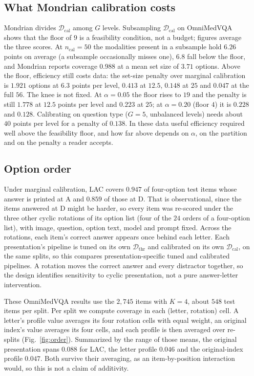 \documentclass[a4paper,conference]{IEEEtran}
\newcommand{\Dthr}{\mathcal{D}_{\mathrm{thr}}}
\newcommand{\Dcal}{\mathcal{D}_{\mathrm{cal}}}
\newcommand{\rtag}[1]{}
\begin{document}
\subsection{What Mondrian calibration costs}\label{sec:budget}

Mondrian divides $\Dcal$ among $G$ levels. Subsampling $\Dcal$ on OmniMedVQA
shows that the floor of $9$ is a feasibility condition, not a budget; figures
average the three scores.\rtag{R2.7} At $n_{\mathrm{cal}}=50$ the modalities present in a
subsample hold $6.26$ points on average (a subsample occasionally misses one),
$6.8$ fall below the floor, and Mondrian reports coverage $0.988$ at a mean set
size of $3.71$ options. Above the floor, efficiency still costs data: the
set-size penalty over marginal calibration is $1.921$ options at $6.3$ points
per level, $0.413$ at $12.5$, $0.148$ at $25$ and $0.047$ at the full $56$.
The knee is not fixed. At $\alpha=0.05$ the floor rises to $19$ and the
penalty is still $1.778$ at $12.5$ points per level and $0.223$ at $25$; at
$\alpha=0.20$ (floor $4$) it is $0.228$ and $0.128$. Calibrating on question
type ($G=5$, unbalanced levels) needs about $40$ points per level for a
penalty of $0.138$. In these data useful efficiency required well above the
feasibility floor, and how far above depends on $\alpha$, on the partition and
on the penalty a reader accepts.\rtag{R1.6}

\subsection{Option order}\label{sec:order}

Under marginal calibration, LAC covers $0.947$ of four-option test items whose
answer is printed at A and $0.859$ of those at D. That is observational, since
the items answered at D might be harder, so every item was re-scored under the
three other cyclic rotations of its option list (four of the $24$ orders of a
four-option list), with image, question, option text, model and prompt fixed.
Across the rotations, each item's correct answer appears once behind each
letter. Each presentation's pipeline is tuned on its own $\Dthr$ and calibrated
on its own $\Dcal$, on the same splits, so this compares presentation-specific
tuned and calibrated pipelines. A rotation moves the correct answer and every
distractor together, so the design identifies sensitivity to cyclic
presentation, not a pure answer-letter intervention.

These OmniMedVQA results use the $2{,}745$ items with $K=4$, about $548$ test
items per split.\rtag{C4} Per split we compute coverage in each (letter, rotation) cell.
A letter's profile value averages its four rotation cells with equal weight, an
original index's value averages its four cells, and each profile is then
averaged over re-splits (Fig.~\ref{fig:order}). Summarized by the range of
those means, the original presentation spans $0.088$ for LAC, the letter
profile $0.046$ and the original-index profile $0.047$. Both survive their
averaging, as an item-by-position interaction would, so this is not a claim of
additivity.
\end{document}
